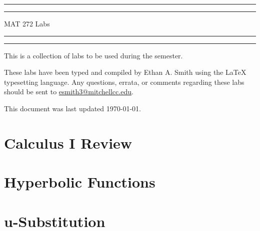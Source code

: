 \documentclass[twoside, addpoints, 12pt, letterpage]{exam}
\begin{document}
\begin{coverpages}
\scshape
\centering
\rule{\textwidth}{1.6pt}\vspace*{-\baselineskip}\vspace*{2pt}
\rule{\textwidth}{0.4pt} %

\vspace{0.75\baselineskip}
    
    {\Huge MAT 272 Labs}
    

\rule{\textwidth}{0.4pt}\vspace*{-\baselineskip}\vspace{3.2pt}
\rule{\textwidth}{1.6pt} %

\vspace{0.75\baselineskip}

This is a collection of labs to be used during the \sem semester.

\vspace{3\baselineskip}

These labs have been typed and compiled by Ethan A. Smith using the \LaTeX\, typesetting language. Any questions, errata, or comments regarding these labs should be sent to \href{mailto:esmith3@mitchellcc.edu}{esmith3@mitchellcc.edu}.




\vspace{3\baselineskip}
This document was last updated \usdate\today.

\tableofcontents
\cleardoublepage
\end{coverpages}

\section{Calculus I Review}
\cleardoublepage

\section{Hyperbolic Functions}
\cleardoublepage

\section{u-Substitution}
\cleardoublepage
\end{document}
